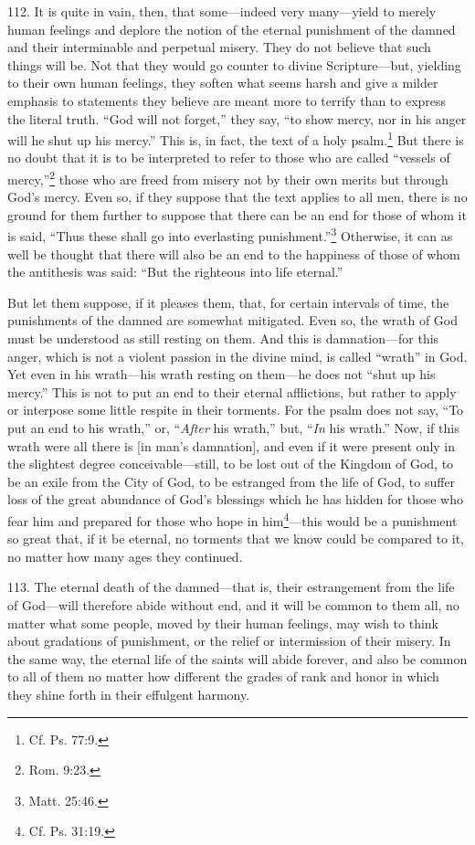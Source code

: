 112. It is quite in vain, then, that some—indeed very many—yield to merely human feelings and deplore the notion of the eternal punishment of the damned and their interminable and perpetual misery. They do not believe that such things will be. Not that they would go counter to divine Scripture—but, yielding to their own human feelings, they soften what seems harsh and give a milder emphasis to statements they believe are meant more to terrify than to express the literal truth. ``God will not forget,'' they say, ``to show mercy, nor in his anger will he shut up his mercy.'' This is, in fact, the text of a holy psalm.\footnote{Cf. Ps. 77:9.} But there is no doubt that it is to be interpreted to refer to those who are called ``vessels of mercy,''\footnote{Rom. 9:23.} those who are freed from misery not by their own merits but through God's mercy. Even so, if they suppose that the text applies to all men, there is no ground for them further to suppose that there can be an end for those of whom it is said, ``Thus these shall go into everlasting punishment.''\footnote{Matt. 25:46.} Otherwise, it can as well be thought that there will also be an end to the happiness of those of whom the antithesis was said: ``But the righteous into life eternal.''

But let them suppose, if it pleases them, that, for certain intervals of time, the punishments of the damned are somewhat mitigated. Even so, the wrath of God must be understood as still resting on them. And this is damnation—for this anger, which is not a violent passion in the divine mind, is called ``wrath'' in God. Yet even in his wrath—his wrath resting on them—he does not ``shut up his mercy.'' This is not to put an end to their eternal afflictions, but rather to apply or interpose some little respite in their torments. For the psalm does not say, ``To put an end to his wrath,'' or, ``\emph{After} his wrath,'' but, ``\emph{In} his wrath.'' Now, if this wrath were all there is [in man's damnation], and even if it were present only in the slightest degree conceivable—still, to be lost out of the Kingdom of God, to be an exile from the City of God, to be estranged from the life of God, to suffer loss of the great abundance of God's blessings which he has hidden for those who fear him and prepared for those who hope in him\footnote{Cf. Ps. 31:19.}—this would be a punishment so great that, if it be eternal, no torments that we know could be compared to it, no matter how many ages they continued.

113. The eternal death of the damned—that is, their estrangement from the life of God—will therefore abide without end, and it will be common to them all, no matter what some people, moved by their human feelings, may wish to think about gradations of punishment, or the relief or intermission of their misery. In the same way, the eternal life of the saints will abide forever, and also be common to all of them no matter how different the grades of rank and honor in which they shine forth in their effulgent harmony.

